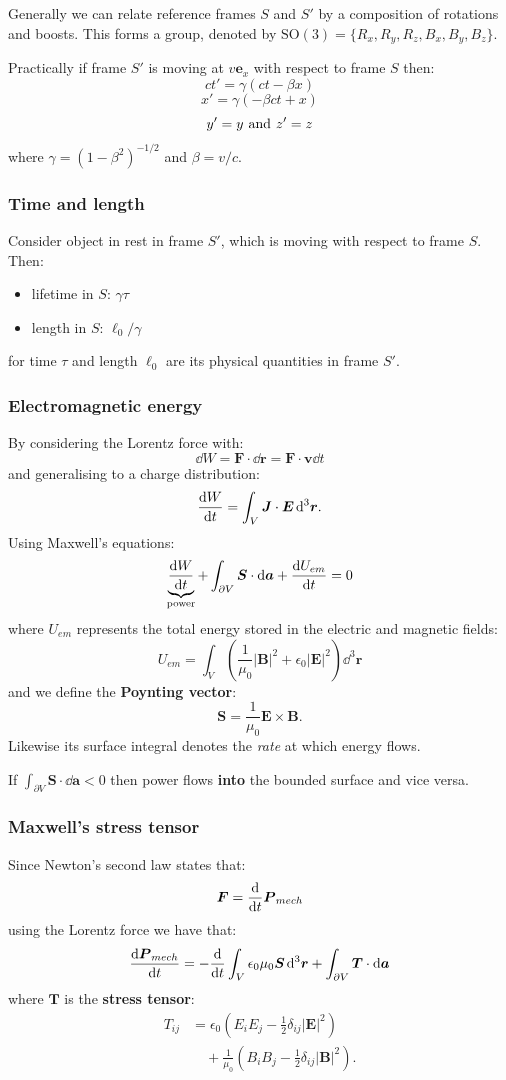 \documentclass{article}
\newcommand{\vc}[1]{\boldsymbol{#1}}
\begin{document}
\begin{multicols*}{3}
Generally we can relate reference frames $S$ and $S'$
by a composition of rotations and boosts. This forms a group,
denoted by $\text{SO}(3)=\{R_x,R_y,R_z,B_x,B_y,B_z\}$.

Practically if frame $S'$ is moving at $v\vc{e}_x$
with respect to frame $S$ then:
$$ct'=\gamma(ct-\beta x)$$
$$x'=\gamma(-\beta ct+x)$$
$$y'=y\hspace{0.05in}\text{and}\hspace{0.05in}z'=z$$
where $\gamma=(1-\beta^2)^{-1/2}$ and $\beta=v/c$.

\subsubsection*{Time and length}
Consider object in rest in frame $S'$, which is moving
with respect to frame $S$. Then:
\begin{itemize}
    \item lifetime in $S$: $\gamma\tau$
    \item length in $S$: $\ell_0/\gamma$
\end{itemize}
for time $\tau$ and length $\ell_0$ are its
physical quantities in frame $S'$.

\subsubsection*{Electromagnetic energy}
By considering the Lorentz force with:
$$\dd W=\vc{F}\cdot\dd\vc{r}=\vc{F}\cdot\vc{v}\dd t$$
and generalising to a charge distribution:
$$\dv{W}{t}=\int_V\vc{J}\cdot\vc{E}\hspace{0.02in}\dd^3\vc{r}.$$
Using Maxwell's equations:
$$\underbrace{\dv{W}{t}}_\text{power}
+\int_{\partial V}\vc{S}\cdot\dd\vc{a}+\dv{U_{em}}{t}=0$$
where $U_{em}$ represents the total energy stored in the
electric and magnetic fields:
$$U_{em}=\int_{V}\left(\frac{1}{\mu_0}|\vc{B}|^2
+\epsilon_0|\vc{E}|^2\right)\dd^3\vc{r}$$
and we define the \textbf{Poynting vector}:
$$\vc{S}=\frac{1}{\mu_0}\vc{E}\times\vc{B}.$$
Likewise its surface integral denotes the \textit{rate}
at which energy flows.

If $\displaystyle\int_{\partial V}\vc{S}\cdot\dd\vc{a}<0$
then power flows \textbf{into} the bounded surface and vice versa.

\subsubsection*{Maxwell's stress tensor}
Since Newton's second law states that:
$$\vc{F}=\dv{t}\vc{P}_{mech}$$
using the Lorentz force we have that:
$$\dv{\vc{P}_{mech}}{t}
=-\dv{t}\int_V\epsilon_0
\mu_0\vc{S}\hspace{0.02in}\dd^3\vc{r}
+\int_{\partial V}\vc{T}\cdot\dd\vc{a}$$
where $\vc{T}$ is the \textbf{stress tensor}:
\begin{align*}
    T_{ij}&=\epsilon_0\left(E_i E_j-\frac{1}{2}
    \delta_{ij}|\vc{E}|^2\right) \\
    &\quad+\frac{1}{\mu_0}\left(B_i B_j-\frac{1}{2}
    \delta_{ij}|\vc{B}|^2\right).
\end{align*}


\end{multicols*}
\end{document}
